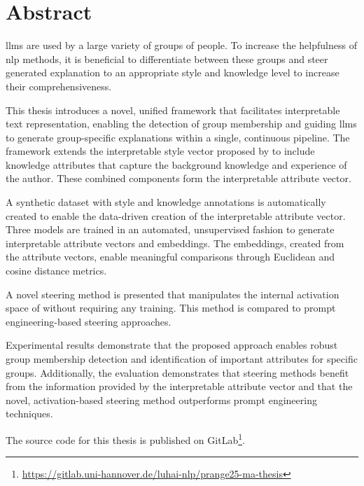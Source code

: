 %
\chapter*{Abstract}%
\label{sec:abstract}
\vspace*{-10mm}

\Acp{llm} are used by a large variety of groups of people. To increase the helpfulness of \ac{nlp} methods, it is beneficial to differentiate between these groups and steer generated explanation to an appropriate style and knowledge level to increase their comprehensiveness.

This thesis introduces a novel, unified framework that facilitates interpretable text representation, enabling the detection of group membership and guiding \acp{llm} to generate group-specific explanations within a single, continuous pipeline. The framework extends the interpretable style vector proposed by \citet{patelLearningInterpretableStyle2023} to include knowledge attributes that capture the background knowledge and experience of the author. These combined components form the interpretable attribute vector.

A synthetic dataset with style and knowledge annotations is automatically created to enable the data-driven creation of the interpretable attribute vector. Three models are trained in an automated, unsupervised fashion to generate interpretable attribute vectors and embeddings. The embeddings, created from the attribute vectors, enable meaningful comparisons through Euclidean and cosine distance metrics.

A novel steering method is presented that manipulates the internal activation space of  without requiring any training. This method is compared to prompt engineering-based steering approaches.

Experimental results demonstrate that the proposed approach enables robust group membership detection and identification of important attributes for specific groups. Additionally, the evaluation demonstrates that steering methods benefit from the information provided by the interpretable attribute vector and that the novel, activation-based steering method outperforms prompt engineering techniques.

The source code for this thesis is published on GitLab\footnote{\url{https://gitlab.uni-hannover.de/luhai-nlp/prange25-ma-thesis}}.



